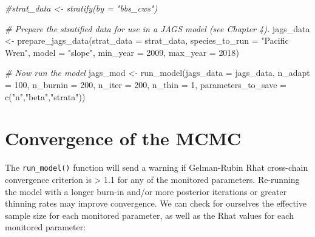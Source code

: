 \documentclass[
]{book}
\newenvironment{Shaded}{\begin{snugshade}}{\end{snugshade}}
\newcommand{\AttributeTok}[1]{\textcolor[rgb]{0.77,0.63,0.00}{#1}}
\newcommand{\CommentTok}[1]{\textcolor[rgb]{0.56,0.35,0.01}{\textit{#1}}}
\newcommand{\DecValTok}[1]{\textcolor[rgb]{0.00,0.00,0.81}{#1}}
\newcommand{\FunctionTok}[1]{\textcolor[rgb]{0.00,0.00,0.00}{#1}}
\newcommand{\NormalTok}[1]{#1}
\newcommand{\OtherTok}[1]{\textcolor[rgb]{0.56,0.35,0.01}{#1}}
\newcommand{\SpecialCharTok}[1]{\textcolor[rgb]{0.00,0.00,0.00}{#1}}
\newcommand{\StringTok}[1]{\textcolor[rgb]{0.31,0.60,0.02}{#1}}
\begin{document}
\begin{Shaded}
\begin{Highlighting}[]
\CommentTok{\#strat\_data \textless{}{-} stratify(by = "bbs\_cws")}

\CommentTok{\# Prepare the stratified data for use in a JAGS model (see Chapter 4).}
\NormalTok{jags\_data }\OtherTok{\textless{}{-}} \FunctionTok{prepare\_jags\_data}\NormalTok{(}\AttributeTok{strat\_data =}\NormalTok{ strat\_data,}
                               \AttributeTok{species\_to\_run =} \StringTok{"Pacific Wren"}\NormalTok{,}
                               \AttributeTok{model =} \StringTok{"slope"}\NormalTok{,}
                               \AttributeTok{min\_year =} \DecValTok{2009}\NormalTok{,}
                               \AttributeTok{max\_year =} \DecValTok{2018}\NormalTok{)}

\CommentTok{\# Now run the model}
\NormalTok{jags\_mod }\OtherTok{\textless{}{-}} \FunctionTok{run\_model}\NormalTok{(}\AttributeTok{jags\_data =}\NormalTok{ jags\_data,}
                      \AttributeTok{n\_adapt =} \DecValTok{100}\NormalTok{,}
                      \AttributeTok{n\_burnin =} \DecValTok{200}\NormalTok{,}
                      \AttributeTok{n\_iter =} \DecValTok{200}\NormalTok{,}
                      \AttributeTok{n\_thin =} \DecValTok{1}\NormalTok{,}
                      \AttributeTok{parameters\_to\_save =} \FunctionTok{c}\NormalTok{(}\StringTok{"n"}\NormalTok{,}\StringTok{"beta"}\NormalTok{,}\StringTok{"strata"}\NormalTok{))}
\end{Highlighting}
\end{Shaded}

\hypertarget{convergence-of-the-mcmc}{%
\section{Convergence of the MCMC}\label{convergence-of-the-mcmc}}

The \texttt{run\_model()} function will send a warning if Gelman-Rubin Rhat cross-chain convergence criterion is \textgreater{} 1.1 for any of the monitored parameters. Re-running the model with a longer burn-in and/or more posterior iterations or greater thinning rates may improve convergence. We can check for ourselves the effective sample size for each monitored parameter, as well as the Rhat values for each monitored parameter:

\begin{Shaded}
\end{Shaded}
\end{document}
